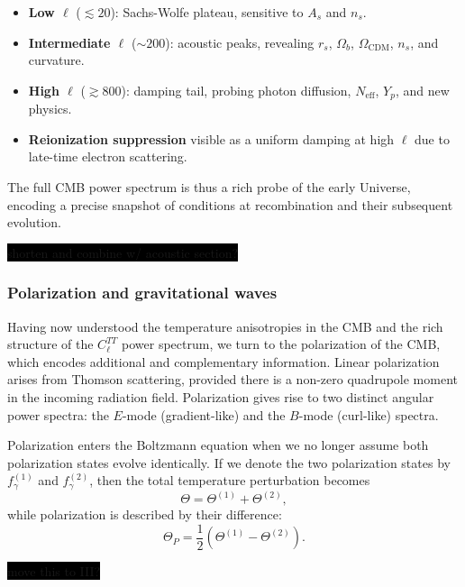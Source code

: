 \documentclass{aa}
\numberwithin{equation}{section}
\numberwithin{table}{section}
\numberwithin{figure}{section}
\begin{document}
\begin{itemize}
    \item \textbf{Low $\ell$} ($\lesssim 20$): Sachs-Wolfe plateau, sensitive to $A_s$ and $n_s$.
    \item \textbf{Intermediate $\ell$} ($\sim 200$): acoustic peaks, revealing $r_s$, $\Omega_b$, $\Omega_\text{CDM}$, $n_s$, and curvature.
    \item \textbf{High $\ell$} ($\gtrsim 800$): damping tail, probing photon diffusion, $N_\text{eff}$, $Y_p$, and new physics.
    \item \textbf{Reionization suppression} visible as a uniform damping at high $\ell$ due to late-time electron scattering.
\end{itemize}

The full CMB power spectrum is thus a rich probe of the early Universe, encoding a precise snapshot of conditions at recombination and their subsequent evolution. 

\colorbox{black}{shorten and combine w/ acoustic section?}
\color{black}


\subsubsection{Polarization and gravitational waves}
\color{Plum}
Having now understood the temperature anisotropies in the CMB and the rich structure of the $C_\ell^{TT}$ power spectrum, we turn to the polarization of the CMB, which encodes additional and complementary information. Linear polarization arises from Thomson scattering, provided there is a non-zero quadrupole moment in the incoming radiation field. Polarization gives rise to two distinct angular power spectra: the $E$-mode (gradient-like) and the $B$-mode (curl-like) spectra.

Polarization enters the Boltzmann equation when we no longer assume both polarization states evolve identically. If we denote the two polarization states by $f_\gamma^{(1)}$ and $f_\gamma^{(2)}$, then the total temperature perturbation becomes
\begin{equation}
\Theta = \Theta^{(1)} + \Theta^{(2)},
\end{equation}
while polarization is described by their difference:
\begin{equation}
\Theta_P = \frac{1}{2} (\Theta^{(1)} - \Theta^{(2)}).
\end{equation}

\colorbox{black}{move this to III?}
\end{document}

